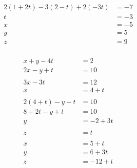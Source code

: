 \documentclass{article}
\begin{document}
\begin{align*}
  2 (1 + 2 t) - 3 (2 - t) + 2 (-3 t) & = -7 \\
  t                                  & = -3 \\
  x                                  & = -5 \\
  y                                  & = 5  \\
  z                                  & = 9
\end{align*}

\setcounter{subsubsection}{72}
\subsubsection{}

\begin{align*}
  x + y - 4 t       & = 2        \\
  2 x - y + t       & = 10       \\ \\
  3 x - 3 t         & = 12       \\
  x                 & = 4 + t    \\ \\
  2 (4 + t) - y + t & = 10       \\
  8 + 2 t - y + t   & = 10       \\
  y                 & = -2 + 3 t \\ \\
  z                 & = t        \\ \\
  x                 & = 5 + t    \\
  y                 & = 6 + 3 t  \\
  z                 & = -12 + t
\end{align*}

\setcounter{subsubsection}{74}
\subsubsection{}
\end{document}
